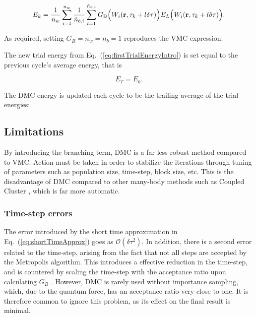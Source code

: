 \begin{equation}
 E_k = \frac{1}{n_w}\sum_{i=1}^{n_w} \frac{1}{\tilde n_{b,i}}\sum_{l=1}^{\tilde n_{b,i}} G_\mathrm{B}\Big(W_i(\mathbf{r}, \tau_k + l\delta\tau)\Big)E_L\Big(W_i(\mathbf{r}, \tau_k + l\delta\tau)\Big). \label{eq:DMC_Ek}
\end{equation}

As required, setting $G_B = n_w = n_b = 1$ reproduces the VMC expression. 

The new trial energy from Eq.~(\ref{eq:firstTrialEnergyIntro}) is set equal to the previous cycle's average energy, that is  

\begin{equation}
 E_T = E_k.
\end{equation}

The DMC energy is updated each cycle to be the trailing average of the trial energies:



\subsection{Limitations}
\label{sec:DMClimitations}

By introducing the branching term, DMC is a far less robust method compared to VMC. Action must be taken in order to stabilize the iterations through tuning of parameters such as population size, time-step, block size, etc. This is the disadvantage of DMC compared to other many-body methods such as Coupled Cluster \cite{Hirth}, which is far more automatic.

\subsubsection{Time-step errors}

The error introduced by the short time approximation in Eq.~(\ref{eq:shortTimeApprox}) goes as $\mathcal{O}(\delta\tau^2)$. In addition, there is a second error related to the time-step, arising from the fact that not all steps are accepted by the Metropolis algorithm. This introduces a effective reduction in the time-step, and is countered by scaling the time-step with the acceptance ratio upon calculating $G_B$ \cite{abInitioMC}. However, DMC is rarely used without importance sampling, which, due to the quantum force, has an acceptance ratio very close to one. It is therefore common to ignore this problem, as its effect on the final result is minimal.

